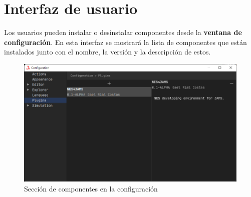 \section{Interfaz de usuario}\label{sec:interfaz-de-usuario}

Los usuarios pueden instalar o desinstalar componentes
desde la \textbf{ventana de configuración}.
En esta interfaz se mostrará la lista de componentes
que están instalados junto con el nombre, la versión
y la descripción de estos.

\begin{figure}[h]
    \centering
    \includegraphics[width=\textwidth]{images/componentes/plugin-ui}
    \caption{Sección de componentes en la configuración}
    \label{fig:plugin-ui}
\end{figure}

